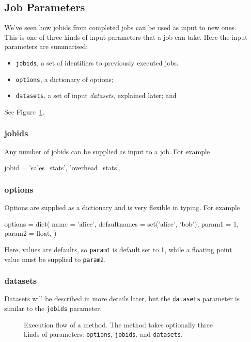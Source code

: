 \documentclass[a4paper]{article}
\begin{document}
\subsection{Job Parameters}


We've seen how jobids from completed jobs can be used as input to new
ones.  This is one of three kinds of input parameters that a job can
take.  Here the input parameters are summarised:
\begin{itemize}
  \item[] \texttt{jobids}, a set of identifiers to previously executed jobs.
  \item[] \texttt{options}, a dictionary of options;
  \item[] \texttt{datasets}, a set of input \textsl{datasets}, explained later; and
\end{itemize}
See Figure~\ref{fig:execflow}.

\subsubsection{jobids}
Any number of jobids can be supplied as input to a job.  For example
\begin{python}
  jobid = {'sales_stats', 'overhead_stats',}
\end{python}

\subsubsection{options}
Options are supplied as a dictionary and is very flexible in typing.  For example
\begin{python}
  options = dict(
    name = 'alice',
    defaultnames = set('alice', 'bob'),
    param1 = 1,
    param2 = float,
  )
\end{python}
Here, values are defaults, so \texttt{param1} is default set to 1,
while a floating point value must be supplied to \texttt{param2}.

\subsubsection{datasets}
Datasets will be described in more details later, but the
\texttt{datasets} parameter is similar to the \texttt{jobids}
parameter.

\begin{figure}[h!]
  \begin{center}
    
    \caption{Execution flow of a method.  The method takes optionally
      three kinds of parameters: \texttt{options}, \texttt{jobids},
      and \texttt{datasets}.}
    \label{fig:execflow}
  \end{center}
\end{figure}
\end{document}

